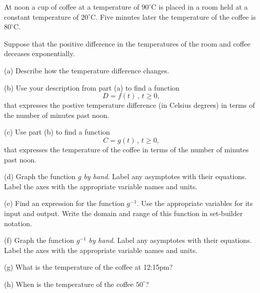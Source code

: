 \documentclass{ximera}
\begin{document}
\begin{question}  \label{Q:LKKDBBDEvc}
At noon a cup of coffee at a temperature of $90^\circ$C is placed in a room held at a constant temperature of $20^\circ$C. Five minutes later the temperature of the coffee is $80^\circ$C.

Suppose that the positive difference in the temperatures of the room and coffee deceases exponentially.

(a) Describe how the temperature difference changes.

(b) Use  your description from part (a) to find a function
\[
   D = f(t) \, , \, t \geq 0,
\]
that expresses the postive temperature difference (in Celsius degrees) in terms of the number of minutes past noon.

(c) Use part (b) to find a function
\[
         C = g(t) \, , \, t \geq 0,
\]
that expresses the temperature of the coffee in terms of the number of minutes past noon.

(d) Graph the function $g$ \emph{by hand}. Label any asymptotes with their equations. Label the axes with the appropriate variable names and units.

(e) Find an expression for the function $g^{-1}$. Use the appropriate variables for its input and output. Write the domain and range of this function in set-builder notation.

(f) Graph the function $g^{-1}$ \emph{by hand}. Label any asymptotes with their equations. Label the axes with the appropriate variable names and units.

(g) What is the temperature of the coffee at 12:15pm?

(h) When is the temperature of the coffee $50^\circ$?
\end{question}
\end{document}
